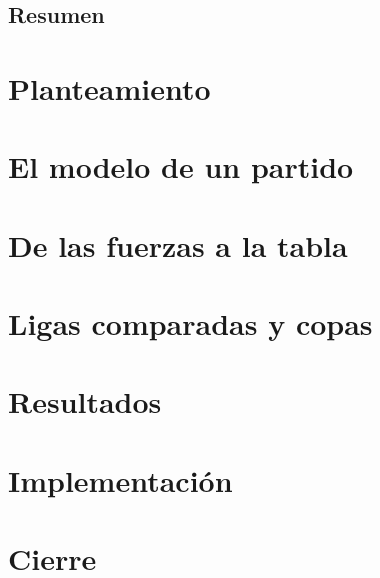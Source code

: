 \documentclass[11pt,a4paper,oneside,openany]{report}
\begin{document}


\chapter*{Resumen}


\tableofcontents
\clearpage
{}

\part{Planteamiento}



\part{El modelo de un partido}




\part{De las fuerzas a la tabla}





\part{Ligas comparadas y copas}




\part{Resultados}





\part{Implementación}



\part{Cierre}


\appendix



\end{document}
